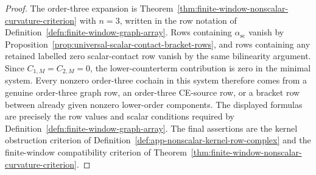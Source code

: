 \begin{proof}
  The order-three expansion is
  Theorem~\ref{thm:finite-window-nonscalar-curvature-criterion} with
  \(n=3\), written in the row notation of
  Definition~\ref{defn:finite-window-graph-array}.  Rows containing
  \(\alpha_{\mathrm{sc}}\) vanish by
  Proposition~\ref{prop:universal-scalar-contact-bracket-rows}, and rows
  containing any retained labelled zero scalar-contact row vanish by the same
  bilinearity argument.  Since \(C_{1,M}=C_{2,M}=0\), the lower-counterterm
  contribution is zero in the minimal system.  Every nonzero order-three
  cochain in this system therefore comes from a genuine order-three graph
  row, an order-three CE-source row, or a bracket row between already
  given nonzero lower-order components.  The displayed formulas are
  precisely the row values and scalar conditions required by
  Definition~\ref{defn:finite-window-graph-array}.  The final assertions are
  the kernel obstruction criterion of
  Definition~\ref{def:app-nonscalar-kernel-row-complex} and the finite-window
  compatibility criterion of
  Theorem~\ref{thm:finite-window-nonscalar-curvature-criterion}.
\end{proof}

